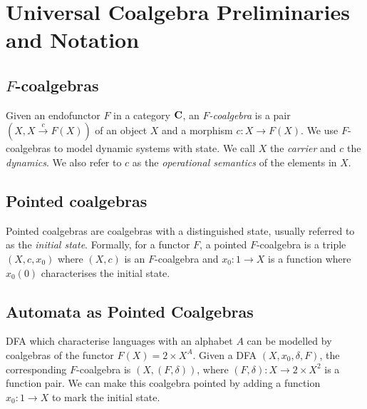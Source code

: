 \section{Universal Coalgebra Preliminaries and Notation}
\label{sec:Preliminaries:Coalgebras}
\subsection{$F$-coalgebras}
Given an endofunctor $F$ in a category $\AsCategory{C}$, an \emph{$F$-coalgebra} is a pair $(X,X\xrightarrow{c}F(X))$ of an object $X$ and a morphism $c\colon X\rightarrow F(X)$. We use $F$-coalgebras to model dynamic systems with state. We call $X$ the \emph{carrier} and $c$ the \emph{dynamics}. We also refer to $c$ as the \emph{operational semantics} of the elements in $X$.


\subsection{Pointed coalgebras}
Pointed coalgebras are coalgebras with a distinguished state, usually referred to as the \emph{initial state}. Formally, for a functor $F$, a pointed $F$-coalgebra is a triple $(X,c, x_0)$ where $(X,c)$ is an $F$-coalgebra and %
$x_0\colon 1\rightarrow X$ is a function where $x_0(0)$ characterises the initial state. 

\subsection{Automata as Pointed Coalgebras}
DFA which characterise languages with an alphabet $A$ can be modelled by coalgebras of the functor $F(X)=2\times X^A$. Given a DFA $(X,x_0,\delta,F)$, the corresponding $F$-coalgebra is $(X,(F,\delta))$, where $(F,\delta)\colon X\rightarrow 2\times X^2$ is a function pair. We can make this coalgebra pointed by adding a function $x_0\colon 1\rightarrow X$ to mark the initial state.


